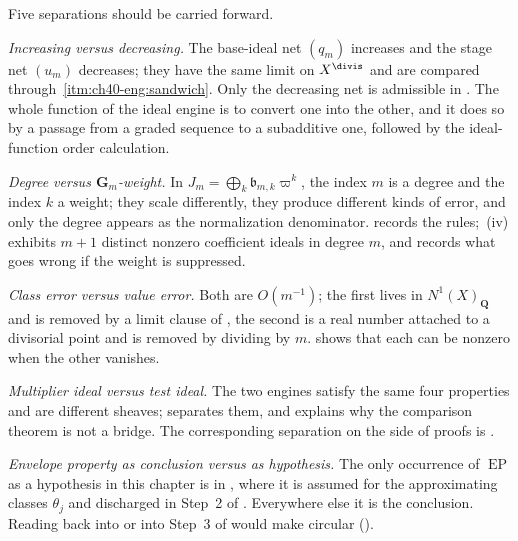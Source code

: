 Five separations should be carried forward.

\emph{Increasing versus decreasing.}  The base-ideal net $(q_m)$ increases
and the stage net $(u_m)$ decreases; they have the same limit on
$X^{\divis}$ and are compared through
\,\cref{itm:ch40-eng:sandwich}.  Only the
decreasing net is admissible in .  The whole function of
the ideal engine is to convert one into the other, and it does so by a
passage from a graded sequence to a subadditive one, followed by the
ideal-function order calculation.

\emph{Degree versus $\mathbf G_m$-weight.}  In $J_m=\bigoplus_k\mathfrak
b_{m,k}\varpi^k$, the index $m$ is a degree and the index $k$ a weight;
they scale differently, they produce different kinds of error, and only the
degree appears as the normalization denominator.
 records the rules;
\,(iv) exhibits $m+1$ distinct nonzero coefficient
ideals in degree $m$, and  records what goes
wrong if the weight is suppressed.

\emph{Class error versus value error.}  Both are $O(m^{-1})$; the first
lives in $N^1(X)_{\mathbf Q}$ and is removed by a limit clause of
, the second is a real number attached to a
divisorial point and is removed by dividing by $m$.
 shows that each can be nonzero when the other
vanishes.

\emph{Multiplier ideal versus test ideal.}  The two engines satisfy the same
four properties and are different sheaves;  separates
them, and  explains why the comparison theorem
 is not a bridge.  The corresponding separation
on the side of proofs is .

\emph{Envelope property as conclusion versus as hypothesis.}  The only
occurrence of $\operatorname{EP}$ as a hypothesis in this chapter is in
, where it is assumed for the approximating
classes $\theta_j$ and discharged in Step~2 of
.  Everywhere else it is the
conclusion.  Reading  back into
 or into Step~3 of
 would make
circular ().

